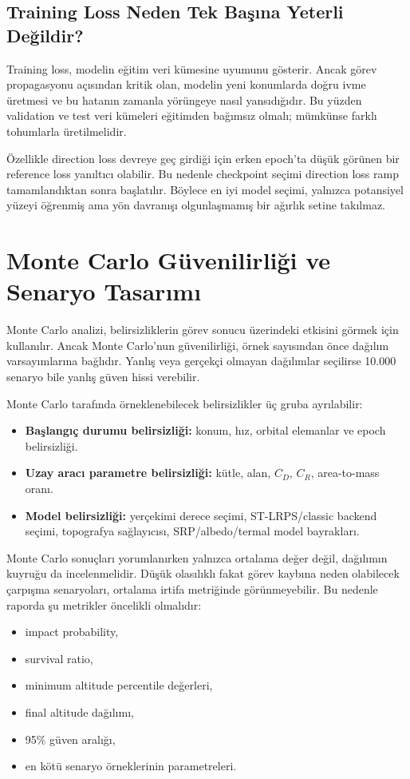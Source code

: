 \subsection{Training Loss Neden Tek Başına Yeterli Değildir?}

Training loss, modelin eğitim veri kümesine uyumunu gösterir. Ancak görev propagasyonu açısından kritik olan, modelin yeni konumlarda doğru ivme üretmesi ve bu hatanın zamanla yörüngeye nasıl yansıdığıdır. Bu yüzden validation ve test veri kümeleri eğitimden bağımsız olmalı; mümkünse farklı tohumlarla üretilmelidir.

Özellikle direction loss devreye geç girdiği için erken epoch'ta düşük görünen bir reference loss yanıltıcı olabilir. Bu nedenle checkpoint seçimi direction loss ramp tamamlandıktan sonra başlatılır. Böylece en iyi model seçimi, yalnızca potansiyel yüzeyi öğrenmiş ama yön davranışı olgunlaşmamış bir ağırlık setine takılmaz.

\section{Monte Carlo Güvenilirliği ve Senaryo Tasarımı}
\label{sec:mc_reliability}

Monte Carlo analizi, belirsizliklerin görev sonucu üzerindeki etkisini görmek için kullanılır. Ancak Monte Carlo'nun güvenilirliği, örnek sayısından önce dağılım varsayımlarına bağlıdır. Yanlış veya gerçekçi olmayan dağılımlar seçilirse 10.000 senaryo bile yanlış güven hissi verebilir.

Monte Carlo tarafında örneklenebilecek belirsizlikler üç gruba ayrılabilir:
\begin{itemize}
    \item \textbf{Başlangıç durumu belirsizliği:} konum, hız, orbital elemanlar ve epoch belirsizliği.
    \item \textbf{Uzay aracı parametre belirsizliği:} kütle, alan, \(C_D\), \(C_R\), area-to-mass oranı.
    \item \textbf{Model belirsizliği:} yerçekimi derece seçimi, ST-LRPS/classic backend seçimi, topografya sağlayıcısı, SRP/albedo/termal model bayrakları.
\end{itemize}

Monte Carlo sonuçları yorumlanırken yalnızca ortalama değer değil, dağılımın kuyruğu da incelenmelidir. Düşük olasılıklı fakat görev kaybına neden olabilecek çarpışma senaryoları, ortalama irtifa metriğinde görünmeyebilir. Bu nedenle raporda şu metrikler öncelikli olmalıdır:
\begin{itemize}
    \item impact probability,
    \item survival ratio,
    \item minimum altitude percentile değerleri,
    \item final altitude dağılımı,
    \item 95\% güven aralığı,
    \item en kötü senaryo örneklerinin parametreleri.
\end{itemize}

